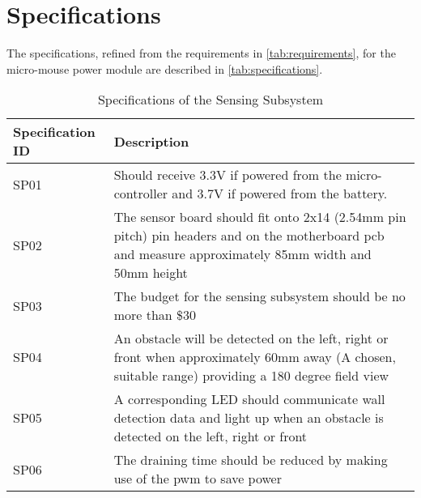 \documentclass[class=report,11pt,crop=false]{standalone}
\begin{document}
\section{Specifications}
The specifications, refined from the requirements in \autoref{tab:requirements}, for the micro-mouse power module are described in \autoref{tab:specifications}.
\begin{table}[h]
    \centering
    \caption{Specifications of the Sensing Subsystem}
    \label{tab:specifications}
    \begin{tabular}{|>{\centering\arraybackslash}m{4cm}|p{10cm}|}
        \hline
        \textbf{Specification ID} & \textbf{Description} \\
        \hline
        SP01 & Should receive 3.3V if powered from the micro-controller and 3.7V if powered from the battery. \\
        \hline
        SP02 & The sensor board should fit onto 2x14 (2.54mm pin pitch) pin headers and on the motherboard pcb and measure approximately 85mm width and 50mm height \\
        \hline
        SP03 & The budget for the sensing subsystem should be no more than \$30 \\
        \hline
        SP04 & An obstacle will be detected on the left, right or front when approximately 60mm away (A chosen, suitable range) providing a 180 degree field view  \\
        \hline
        SP05 & A corresponding LED should communicate wall detection data and light up when an obstacle is detected on the left, right or front  \\
        \hline
        SP06 & The draining time should be reduced by making use of the pwm to save power\\
        \hline
    \end{tabular}
\end{table}

\end{document}
